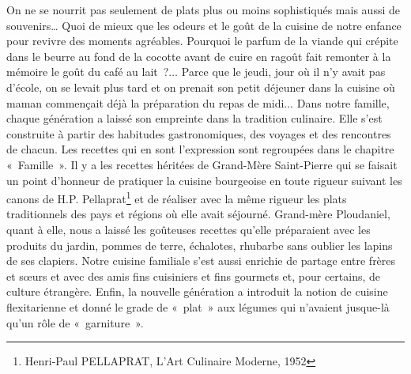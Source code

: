 On ne se nourrit pas seulement de plats plus ou moins sophistiqués mais aussi de souvenirs… Quoi de mieux que les odeurs et le goût de la cuisine de notre enfance pour revivre des moments agréables. Pourquoi le parfum de la viande qui crépite dans le beurre au fond de la cocotte avant de cuire en ragoût fait remonter à la mémoire le goût du café au lait ?$\ldots$ Parce que le jeudi, jour où il n’y avait pas d’école, on se levait plus tard et on prenait son petit déjeuner dans la cuisine où maman commençait déjà la préparation du repas de midi$\ldots$
Dans notre famille, chaque génération a laissé son empreinte dans la tradition culinaire. Elle s’est construite à partir des habitudes gastronomiques, des voyages et des rencontres de chacun. Les recettes qui en sont l’expression sont regroupées dans le chapitre « Famille ». Il y a les recettes héritées de Grand-Mère Saint-Pierre qui se faisait un point d’honneur de pratiquer la cuisine bourgeoise en toute rigueur suivant les canons de H.P. Pellaprat\footnote{Henri-Paul PELLAPRAT, L’Art Culinaire Moderne, 1952} et de réaliser avec la même rigueur les plats traditionnels des pays et régions où elle avait séjourné. Grand-mère Ploudaniel, quant à elle, nous a laissé les goûteuses recettes qu’elle préparaient avec les produits du jardin, pommes de terre, échalotes, rhubarbe sans oublier les lapins de ses clapiers. Notre cuisine familiale s’est aussi enrichie de partage entre frères et sœurs et avec des amis fins cuisiniers et fins gourmets et, pour certains, de culture étrangère. Enfin, la nouvelle génération a introduit la notion de cuisine flexitarienne et donné le grade de « plat » aux légumes qui n’avaient jusque-là qu’un rôle de « garniture ». 
